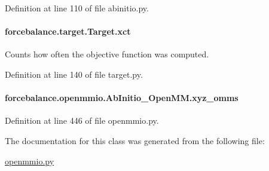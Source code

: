 Definition at line 110 of file abinitio.\-py.

\hypertarget{classforcebalance_1_1target_1_1Target_aad2e385cfbf7b4a68f1c2cb41133fe82}{
\paragraph[{xct}]{\setlength{\rightskip}{0pt plus 5cm}forcebalance.\-target.\-Target.\-xct\hspace{0.3cm}{\ttfamily [inherited]}}}\label{classforcebalance_1_1target_1_1Target_aad2e385cfbf7b4a68f1c2cb41133fe82}


Counts how often the objective function was computed. 



Definition at line 140 of file target.\-py.

\hypertarget{classforcebalance_1_1openmmio_1_1AbInitio__OpenMM_a355176032e08dff544b81a12d8e82a9e}{
\paragraph[{xyz\-\_\-omms}]{\setlength{\rightskip}{0pt plus 5cm}forcebalance.\-openmmio.\-Ab\-Initio\-\_\-\-Open\-M\-M.\-xyz\-\_\-omms}}\label{classforcebalance_1_1openmmio_1_1AbInitio__OpenMM_a355176032e08dff544b81a12d8e82a9e}


Definition at line 446 of file openmmio.\-py.



The documentation for this class was generated from the following file\-:\begin{DoxyCompactItemize}
\item 
\hyperlink{openmmio_8py}{openmmio.\-py}\end{DoxyCompactItemize}
